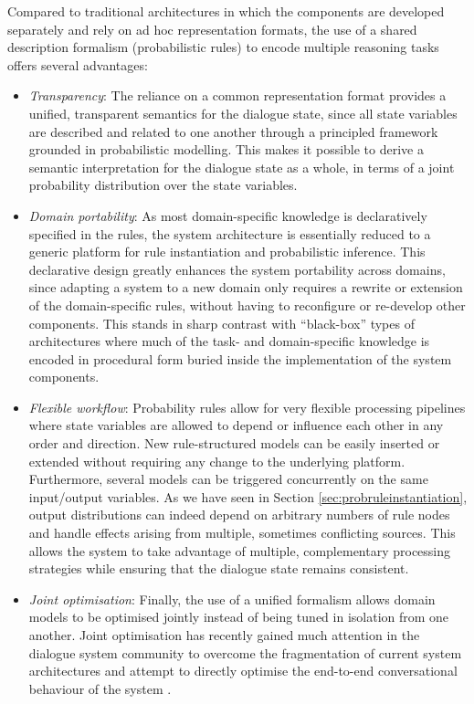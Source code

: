 Compared to traditional architectures in which the components are developed separately and rely on ad hoc representation formats, the use of a shared description formalism (probabilistic rules) to encode multiple reasoning tasks offers several advantages:
\begin{itemize}
\item \textit{Transparency}:  The reliance on a common representation format provides a unified, transparent semantics for the dialogue state, since all state variables are described and related to one another through a principled framework grounded in probabilistic modelling.  This makes it possible to derive a semantic interpretation for the dialogue state as a whole, in terms of a joint probability distribution over the state variables. 

\item \textit{Domain portability}:   As most domain-specific knowledge is declaratively specified in the rules, the system architecture is essentially reduced to a generic platform for rule instantiation and probabilistic inference.  This declarative design greatly enhances the system portability across domains, since adapting a system to a new domain only requires a rewrite or extension of the domain-specific rules, without having to reconfigure or re-develop other components.  This stands in sharp contrast with ``black-box'' types of architectures where much of the task- and domain-specific knowledge is encoded in procedural form buried inside the implementation of the system components.

\item \textit{Flexible workflow}:  Probability rules allow for very flexible processing pipelines where state variables are allowed to depend or influence each other in any order and direction.  New rule-structured models can be easily inserted or extended without requiring any change to the underlying platform. Furthermore, several models can be triggered concurrently on the same input/output variables. As we have seen in Section \ref{sec:probruleinstantiation}, output distributions can indeed depend on arbitrary numbers of rule nodes and handle effects arising from multiple, sometimes conflicting sources. This allows the system to take advantage of multiple, complementary processing strategies while ensuring that the dialogue state remains consistent. 

\item \textit{Joint optimisation}:  Finally, the use of a unified formalism allows domain models to be optimised jointly instead of being tuned in isolation from one another. Joint optimisation has recently gained much attention in the dialogue system community to overcome the fragmentation of current system architectures and attempt to directly optimise the end-to-end conversational behaviour of the system \citep[see also][]{Lemon:2011}. 

\end{itemize}


